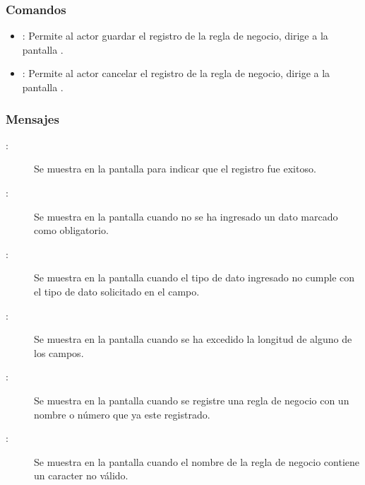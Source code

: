 \subsubsection{Comandos}
\begin{itemize}
	\item {}: Permite al actor guardar el registro de la regla de negocio, dirige a la pantalla .
	\item {}: Permite al actor cancelar el registro de la regla de negocio, dirige a la pantalla .
\end{itemize}

\subsubsection{Mensajes}
	
\begin{description}
	\item[:] Se muestra en la pantalla  para indicar que el registro fue exitoso.
	\item[:] Se muestra en la pantalla  cuando no se ha ingresado un dato marcado como obligatorio.
	\item[:] Se muestra en la pantalla  cuando el tipo de dato ingresado no cumple con el tipo de dato solicitado en el campo.
	\item[:] Se muestra en la pantalla  cuando se ha excedido la longitud de alguno de los campos.
	\item[:] Se muestra en la pantalla  cuando se registre una regla de negocio con un nombre o número que ya este registrado.
	\item[:] Se muestra en la pantalla  cuando el nombre de la regla de negocio contiene un caracter no válido.
\end{description}
